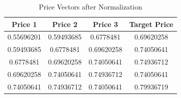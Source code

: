 \begin{table}{}
\begin{center}
\begin{tabular}{ c | c | c | c }
    \hline
    \textbf{Price 1} &  \textbf{Price 2} &    \textbf{Price 3} &   \textbf{Target Price} \\ \hline
    0.55696201 &  0.59493685&  0.6778481 &0.69620258\\ \hline
    0.59493685 &  0.6778481 &  0.69620258 &0.74050641\\ \hline
     0.6778481 &  0.69620258 &  0.74050641&0.74936712\\ \hline
     0.69620258 & 0.74050641 &  0.74936712 &0.74050641\\ \hline
     0.74050641 &  0.74936712 &  0.74050641 &0.79936719\\ \hline
    \hline
  \end{tabular}
\caption{Price Vectors after Normalization}
\end{center}
\label{table:train}
 \end{table}
 
